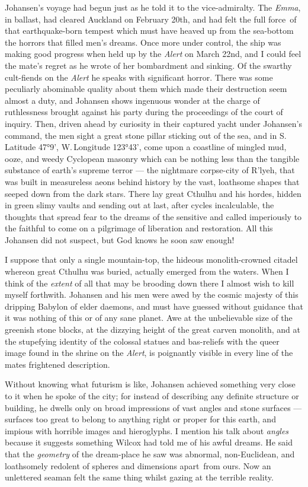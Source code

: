 Johansen's voyage had begun just as he told it to the vice-admiralty.
The \emph{Emma}, in ballast, had cleared Auckland on February 20th, and had
felt the full force\est\ of that earthquake-born tempest which must have
heaved up from the sea-bottom the horrors that filled men's dreams. Once
more under control, the ship was making good progress when held up by
the \emph{Alert} on March 22nd, and I could feel the mate's regret as he wrote
of her bombardment and sinking. Of the swarthy cult-fiends on the \emph{Alert}
he speaks with significant horror. There was some peculiarly abominable
quality about them which made their destruction seem almost a duty, and
Johansen shows ingenuous wonder at the charge of ruthlessness brought
against his party during the proceedings of the court of inquiry. Then,
driven ahead by curiosity in their captured yacht under Johansen's
command, the men sight a great stone pillar sticking out of the sea, and
in S.\,Latitude 47°9', W.\,Longitude 123°43', come upon a coastline of
mingled mud, ooze, and weedy Cyclopean masonry which can be nothing less
than the tangible substance of earth's supreme terror --- the nightmare
corpse-city of R'lyeh, that was built in measureless aeons behind
history by the vast, loathsome shapes that seeped down from the dark
stars. There lay great Cthulhu and his hordes, hidden in green slimy
vaults and sending out at last, after cycles incalculable, the thoughts
that spread fear to the dreams of the sensitive and called imperiously
to the faithful to come on a pilgrimage of liberation and restoration.
All this Johansen did not suspect, but God knows he soon saw enough!

I suppose that only a single mountain-top, the hideous monolith-crowned
citadel whereon great Cthulhu was buried, actually emerged from the
waters. When I think of the \emph{extent} of all that may be brooding down
there I almost wish to kill myself forthwith. Johansen and his men were
awed by the cosmic majesty of this dripping Babylon of elder daemons,
and must have guessed without guidance that it was nothing of this or of
any sane planet. Awe at the unbelievable size of the greenish stone
blocks, at the dizzying height of the great carven monolith, and at the
stupefying identity of the colossal statues and bas-reliefs with the
queer image found in the shrine on the \emph{Alert}, is poignantly visible in
every line of the mates frightened description.

Without knowing what futurism is like, Johansen achieved something very
close to it when he spoke of the city; for instead of describing any
definite structure or building, he dwells only on broad impressions of
vast angles and stone surfaces --- surfaces too great to belong to
anything right or proper for this earth, and impious with horrible
images and hieroglyphs. I mention his talk about \emph{angles} because it
suggests something Wilcox had told me of his awful dreams. He said that
the \emph{geometry} of the dream-place he saw was abnormal, non-Euclidean, and
loathsomely redolent of spheres and dimensions apart\est\ from ours. Now an
unlettered seaman felt the same thing whilst gazing at the terrible
reality.

